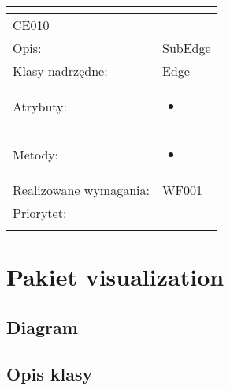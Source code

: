 \documentclass[a4paper,10pt]{article}
\begin{document}
\begin{center}
\begin{tabular}{|m{3cm}|m{9cm}|}
\multicolumn{2}{c}{} \\
 \hline

CE010 &  \\ \hline
Opis: & SubEdge    \\ \hline
Klasy nadrzędne: & Edge    \\ \hline
Atrybuty: & \begin{itemize}
 \item 
\end{itemize}
 \\ \hline
Metody: & \begin{itemize}
 \item 
\end{itemize}
  \\ \hline
Realizowane wymagania: & WF001 \\ \hline
Priorytet: &  \\ \hline

\multicolumn{2}{c}{} \\
 \hline


\end{tabular}

\end{center}

\section{Pakiet visualization }

\subsection{Diagram}

\subsection{Opis klasy}
\end{document}
